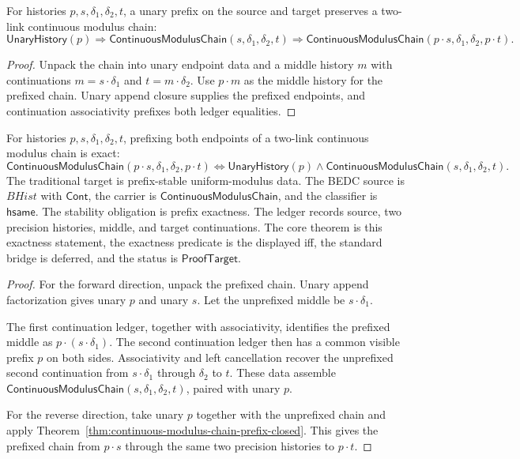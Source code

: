 \begin{theorem}
\label{thm:continuous-modulus-chain-prefix-closed}
For histories $p,s,\delta_1,\delta_2,t$, a unary prefix on the source and
target preserves a two-link continuous modulus chain:
$$
\mathsf{UnaryHistory}(p)
\Longrightarrow
\mathsf{ContinuousModulusChain}(s,\delta_1,\delta_2,t)
\Longrightarrow
\mathsf{ContinuousModulusChain}(p \cdot s,\delta_1,\delta_2,p \cdot t).
$$
\end{theorem}
\begin{proof}
Unpack the chain into unary endpoint data and a middle history $m$ with
continuations $m=s\cdot\delta_1$ and $t=m\cdot\delta_2$. Use $p\cdot m$ as the
middle history for the prefixed chain. Unary append closure supplies the
prefixed endpoints, and continuation associativity prefixes both ledger
equalities.
\end{proof}

\begin{theorem}
\label{thm:continuous-modulus-chain-prefix-iff}
For histories $p,s,\delta_1,\delta_2,t$, prefixing both endpoints of a
two-link continuous modulus chain is exact:
$$
\mathsf{ContinuousModulusChain}(p\cdot s,\delta_1,\delta_2,p\cdot t)
\Longleftrightarrow
\mathsf{UnaryHistory}(p)\wedge
\mathsf{ContinuousModulusChain}(s,\delta_1,\delta_2,t).
$$
The traditional target is prefix-stable uniform-modulus data. The BEDC source
is $BHist$ with $\mathsf{Cont}$, the carrier is
$\mathsf{ContinuousModulusChain}$, and the classifier is $\mathsf{hsame}$. The
stability obligation is prefix exactness. The ledger records source, two
precision histories, middle, and target continuations. The core theorem is
this exactness statement, the exactness predicate is the displayed iff, the
standard bridge is deferred, and the status is $\mathsf{ProofTarget}$.
\end{theorem}
\begin{proof}
For the forward direction, unpack the prefixed chain. Unary append
factorization gives unary $p$ and unary $s$. Let the unprefixed middle be
$s\cdot\delta_1$.

The first continuation ledger, together with associativity, identifies the
prefixed middle as $p\cdot(s\cdot\delta_1)$. The second continuation ledger
then has a common visible prefix $p$ on both sides. Associativity and left
cancellation recover the unprefixed second continuation from
$s\cdot\delta_1$ through $\delta_2$ to $t$. These data assemble
$\mathsf{ContinuousModulusChain}(s,\delta_1,\delta_2,t)$, paired with unary
$p$.

For the reverse direction, take unary $p$ together with the unprefixed chain
and apply Theorem~\ref{thm:continuous-modulus-chain-prefix-closed}. This gives
the prefixed chain from $p\cdot s$ through the same two precision histories to
$p\cdot t$.
\end{proof}


